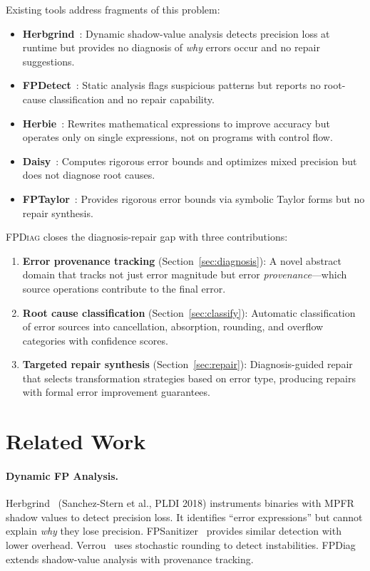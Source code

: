 \documentclass[11pt]{article}
\begin{document}
Existing tools address fragments of this problem:
\begin{itemize}
\item \textbf{Herbgrind}~\cite{herbgrind}: Dynamic shadow-value analysis detects precision loss at runtime but provides no diagnosis of \emph{why} errors occur and no repair suggestions.
\item \textbf{FPDetect}~\cite{fpdetect}: Static analysis flags suspicious patterns but reports no root-cause classification and no repair capability.
\item \textbf{Herbie}~\cite{herbie}: Rewrites mathematical expressions to improve accuracy but operates only on single expressions, not on programs with control flow.
\item \textbf{Daisy}~\cite{daisy}: Computes rigorous error bounds and optimizes mixed precision but does not diagnose root causes.
\item \textbf{FPTaylor}~\cite{fptaylor}: Provides rigorous error bounds via symbolic Taylor forms but no repair synthesis.
\end{itemize}

\textsc{FPDiag} closes the diagnosis-repair gap with three contributions:
\begin{enumerate}
\item \textbf{Error provenance tracking} (Section~\ref{sec:diagnosis}): A novel abstract domain that tracks not just error magnitude but error \emph{provenance}---which source operations contribute to the final error.
\item \textbf{Root cause classification} (Section~\ref{sec:classify}): Automatic classification of error sources into cancellation, absorption, rounding, and overflow categories with confidence scores.
\item \textbf{Targeted repair synthesis} (Section~\ref{sec:repair}): Diagnosis-guided repair that selects transformation strategies based on error type, producing repairs with formal error improvement guarantees.
\end{enumerate}

\section{Related Work}
\label{sec:related}

\paragraph{Dynamic FP Analysis.} Herbgrind~\cite{herbgrind} (Sanchez-Stern et al., PLDI 2018) instruments binaries with MPFR shadow values to detect precision loss. It identifies ``error expressions'' but cannot explain \emph{why} they lose precision. FPSanitizer~\cite{fpsanitizer} provides similar detection with lower overhead. Verrou~\cite{verrou} uses stochastic rounding to detect instabilities. FPDiag extends shadow-value analysis with provenance tracking.
\end{document}
